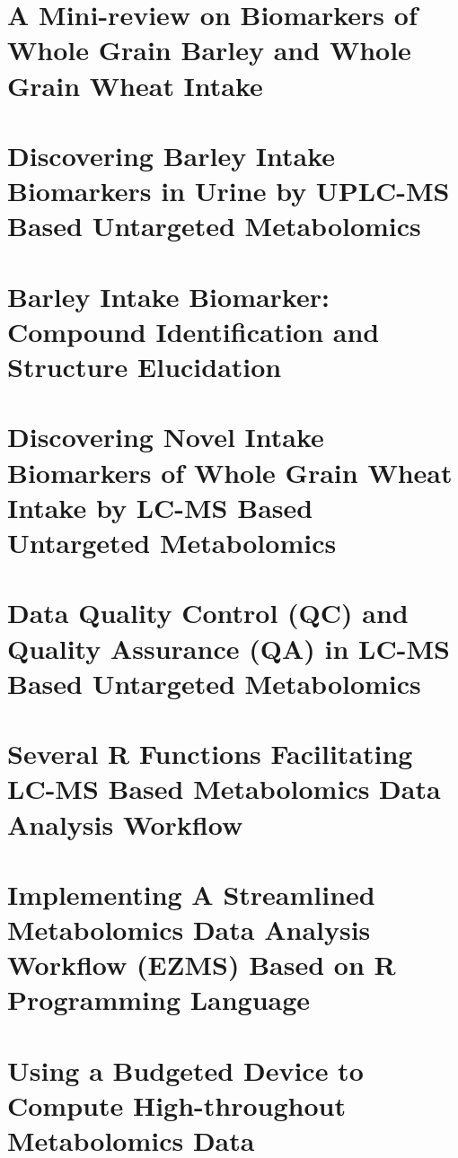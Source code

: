 \documentclass[]{scrreprt}
\begin{document}
%

\chapter{A Mini-review on Biomarkers of Whole Grain Barley and Whole Grain Wheat Intake}
%

\chapter{Discovering Barley Intake Biomarkers in Urine by UPLC-MS Based Untargeted Metabolomics}

\chapter{Barley Intake Biomarker: Compound Identification and Structure Elucidation}


\chapter{Discovering Novel Intake Biomarkers of Whole Grain Wheat Intake by LC-MS Based Untargeted Metabolomics}

\chapter{Data Quality Control (QC) and Quality Assurance (QA) in LC-MS Based Untargeted Metabolomics}


\chapter{Several R Functions Facilitating LC-MS Based Metabolomics Data Analysis Workflow}


\chapter{Implementing A Streamlined Metabolomics Data Analysis Workflow (EZMS) Based on R Programming Language}

\chapter{Using a Budgeted Device to Compute High-throughout Metabolomics Data}


\end{document}
